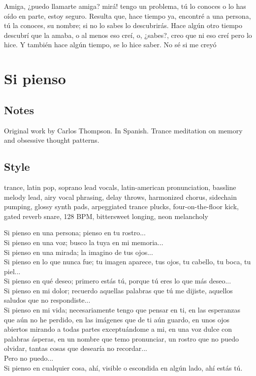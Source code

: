 \begin{lyrics}

Amiga, ¿puedo llamarte amiga? mirá! tengo un problema, tú lo conoces o lo has oído en parte, estoy seguro.  Resulta que, hace tiempo ya, encontré a una persona, tú la conoces, su nombre; si no lo sabes lo descubrirás.  Hace algún otro tiempo descubrí que la amaba, o al menos eso creí, o, ¿sabes?, creo que ni eso creí pero lo hice.  Y también hace algún tiempo, se lo hice saber.  No sé si me creyó 

\end{lyrics}

\section{Si pienso}

\subsection{Notes}
Original work by Carlos Thompson.
In Spanish. Trance meditation on memory and obsessive thought patterns.

\subsection{Style}
trance, latin pop, soprano lead vocals, latin-american pronunciation, bassline melody lead, airy vocal phrasing, delay throws, harmonized chorus, sidechain pumping, glossy synth pads, arpeggiated trance plucks, four-on-the-floor kick, gated reverb snare, 128 BPM, bittersweet longing, neon melancholy

\begin{lyrics}
Si pienso en una persona; pienso en tu rostro...\\
Si pienso en una voz; busco la tuya en mi memoria...\\
Si pienso en una mirada; la imagino de tus ojos...\\
Si pienso en lo que nunca fue; tu imagen aparece, tus ojos, tu cabello, tu boca, tu piel...\\
Si pienso en qué deseo; primero estás tú, porque tú eres lo que más deseo...\\
Si pienso en mi dolor; recuerdo aquellas palabras que tú me dijiste, aquellos saludos que no respondiste...\\
Si pienso en mi vida; necesariamente tengo que pensar en ti, en las esperanzas que aún no he perdido, en las imágenes que de ti aún guardo, en unos ojos abiertos mirando a todas partes exceptuándome a mi, en una voz dulce con palabras ásperas, en un nombre que temo pronunciar, un rostro que no puedo olvidar, tantas cosas que desearía no recordar...\\
Pero no puedo...\\
Si pienso en cualquier cosa, ahí, visible o escondida en algún lado, ahí estás tú.
\end{lyrics}

